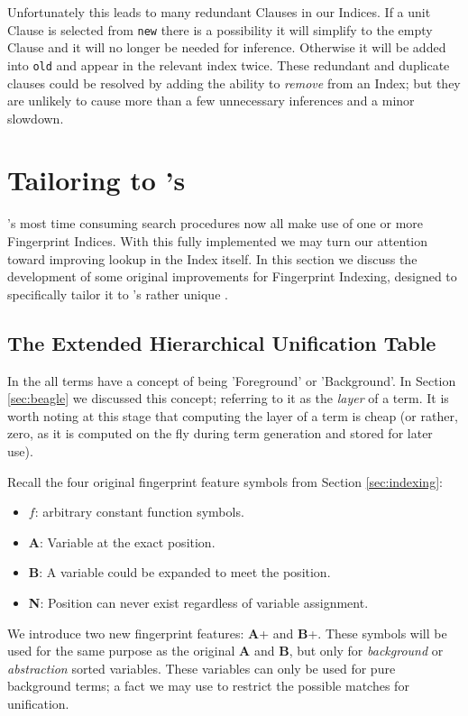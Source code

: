 Unfortunately this leads to many redundant Clauses in our Indices. If a unit Clause
is selected from \verb!new! there is a possibility it will simplify to the empty
Clause and it will no longer be needed for inference. Otherwise it will be added
into \verb!old! and appear in the relevant index twice. These redundant and 
duplicate clauses could be resolved by adding the ability to \emph{remove} from
an Index; but they are unlikely to cause more than a few unnecessary inferences and
a minor slowdown. 

\section{Tailoring to \Beagle's \HSWAC}
\label{sec:tailored}

\Beagle's most time consuming search procedures now all make use of one or more
Fingerprint Indices. With this fully implemented we may turn our attention
toward improving lookup in the Index itself.
In this section we discuss the development of some original improvements for Fingerprint Indexing,
designed to specifically tailor it to \beagle's
rather unique \HSWAC.

\subsection{The Extended Hierarchical Unification Table}

In the {\HSWAC} all terms have 
a concept of being 'Foreground' or 'Background'. In Section \ref{sec:beagle} we
discussed this concept; referring to it as the \emph{layer} of a term. It is
worth noting at this stage that computing the layer of a term is cheap (or rather,
zero, as it is computed on the fly during term generation and stored for later use).

Recall the four original fingerprint feature symbols from Section \ref{sec:indexing}:
\begin{itemize}
\item $f$: arbitrary constant function symbols.
\item \textbf{A}: Variable at the exact position.
\item \textbf{B}: A variable could be expanded to meet the position.
\item \textbf{N}: Position can never exist regardless of variable assignment.
\end{itemize}
We introduce two new fingerprint features: \textbf{A}+ and \textbf{B}+.
These symbols will be used for the same purpose as the original \textbf{A} and \textbf{B}, but
only for \emph{background} or \emph{abstraction} sorted variables. These variables
can only be used for pure background terms; a fact we may use to restrict the possible
matches for unification.

